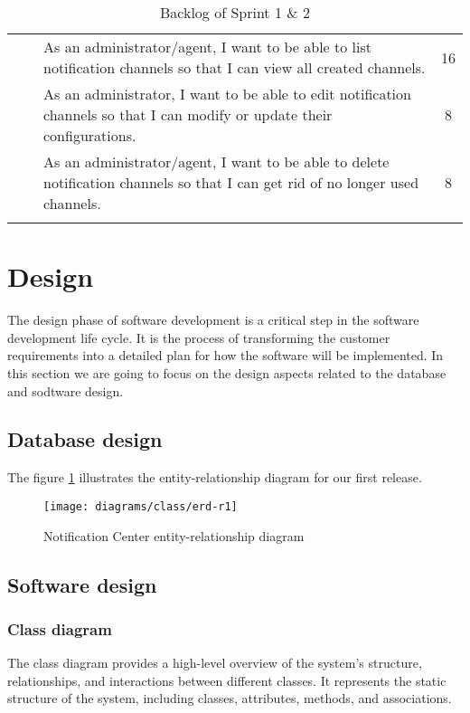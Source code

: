 \begin{longtable}{ | m{}  | m{} | m{} | c | }
    \cline{3-4}
                            &                                                     & As an administrator/agent, I want to be able to list notification channels so that I can view all created channels.                   & 16                  \\
    \cline{3-4}
                            &                                                     & As an administrator, I want to be able to edit notification channels so that I can modify or update their configurations.             & 8                   \\
    \cline{3-4}
                            &                                                     & As an administrator/agent, I want to be able to delete notification channels so that I can get rid of no longer used channels.        & 8                   \\
    \hline
    \caption{Backlog of Sprint 1 \& 2}
\end{longtable}

\section{Design}
The design phase of software development is a critical step in the software development life cycle.
It is the process of transforming the customer requirements into a detailed plan for how the software
will be implemented. In this section we are going to focus on the design aspects related to the database
and sodtware design.

\subsection{Database design}
The figure \ref{g-erd}  illustrates the entity-relationship diagram for our first release.
\begin{figure}[hbt!]
    \centering
    \texttt{[image: diagrams/class/erd-r1]}
    \caption{Notification Center entity-relationship diagram}
    \label{g-erd}
\end{figure}

\subsection{Software design}

\subsubsection{Class diagram}
The class diagram provides a high-level overview of the system's structure, relationships,
and interactions between different classes. It represents the static structure of the system,
including classes, attributes, methods, and associations.

